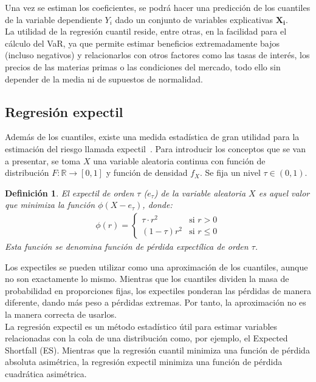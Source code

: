 \documentclass[11pt]{book}
\theoremstyle{plain} %
\newtheorem{definition}{Definición}
\theoremstyle{definition} %
\begin{document}
Una vez se estiman los coeficientes, se podrá hacer una predicción de los 
cuantiles de la variable dependiente $Y_i$ dado un conjunto de variables 
explicativas $\mathbf{X_i}$.\\

La utilidad de la regresión cuantil reside, entre otras, en la facilidad para 
el cálculo del VaR, ya que permite estimar beneficios extremadamente bajos 
(incluso negativos) y relacionarlos con otros factores como las tasas de interés,
los precios de las materias primas o las condiciones del mercado, todo ello 
sin depender de la media ni de supuestos de normalidad.


\subsection{Regresión expectil}
Además de los cuantiles, existe una medida estadística de gran utilidad 
para la estimación del riesgo llamada expectil~\cite{NP87}. Para introducir los conceptos que se van a presentar, se toma $X$ una 
variable aleatoria continua con función de distribución  
$F: \mathbb{R} \to [0,1]$ y función de densidad $f_X$. Se fija un nivel 
$\tau \in (0,1)$.
\begin{definition}
   El expectil de orden $\tau$ ($e_\tau$) de la variable 
   aleatoria $X$ es aquel valor que minimiza la función $\phi(X-e_\tau)$, donde:
   \begin{align*}
      \phi(r) = 
      \begin{cases}
            \tau \cdot  r^2 & \text{si } r > 0 \\
            (1 - \tau)r^2 & \text{si } r \leq 0
      \end{cases}
   \end{align*}
   Esta función se denomina función de pérdida expectílica de orden $\tau$.
\end{definition}


Los expectiles se pueden utilizar como una aproximación de los cuantiles, 
aunque no son exactamente lo mismo. Mientras que los cuantiles dividen la
masa de probabilidad en proporciones fijas, los expectiles ponderan las 
pérdidas de manera diferente, dando más peso a pérdidas extremas. 
Por tanto, la aproximación no es la manera correcta de usarlos. \\

La regresión expectil es un método estadístico útil para estimar variables 
relacionadas con la cola de una distribución como, por ejemplo, 
el Expected Shortfall (ES). 
Mientras que la regresión cuantil minimiza una función de pérdida absoluta 
asimétrica, la regresión expectil minimiza una función de pérdida cuadrática 
asimétrica.\\
\end{document}
